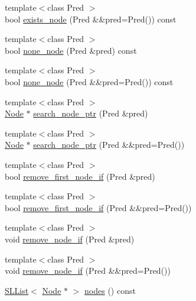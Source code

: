 \begin{DoxyCompactItemize}
\item 
{\footnotesize template$<$class Pred $>$ }\\bool \hyperlink{class_designar_1_1_base_graph_a62df2c7ec71d2b009e96f8974968a3fc}{exists\+\_\+node} (Pred \&\&pred=Pred()) const
\item 
{\footnotesize template$<$class Pred $>$ }\\bool \hyperlink{class_designar_1_1_base_graph_aa87c903e7fbf82a30edc9e442a115050}{none\+\_\+node} (Pred \&pred) const
\item 
{\footnotesize template$<$class Pred $>$ }\\bool \hyperlink{class_designar_1_1_base_graph_a394cdb81d0b0402e348dc87d2456d2d7}{none\+\_\+node} (Pred \&\&pred=Pred()) const
\item 
{\footnotesize template$<$class Pred $>$ }\\\hyperlink{namespace_designar_a5af326c65aa2bd26b26c410f2030d09e}{Node} $\ast$ \hyperlink{class_designar_1_1_base_graph_a0bbbf3b9188013698462e015f37f6b2d}{search\+\_\+node\+\_\+ptr} (Pred \&pred)
\item 
{\footnotesize template$<$class Pred $>$ }\\\hyperlink{namespace_designar_a5af326c65aa2bd26b26c410f2030d09e}{Node} $\ast$ \hyperlink{class_designar_1_1_base_graph_a1f19e5a79bfa156fd4cd80f3d8e27aa4}{search\+\_\+node\+\_\+ptr} (Pred \&\&pred=Pred())
\item 
{\footnotesize template$<$class Pred $>$ }\\bool \hyperlink{class_designar_1_1_base_graph_a1311af417ba4d373d7051b73cc2696ec}{remove\+\_\+first\+\_\+node\+\_\+if} (Pred \&pred)
\item 
{\footnotesize template$<$class Pred $>$ }\\bool \hyperlink{class_designar_1_1_base_graph_aec049416b5240910cb04b1d6f55fcecf}{remove\+\_\+first\+\_\+node\+\_\+if} (Pred \&\&pred=Pred())
\item 
{\footnotesize template$<$class Pred $>$ }\\void \hyperlink{class_designar_1_1_base_graph_aae56ca6b3b936835d07275f2ceb4b0d1}{remove\+\_\+node\+\_\+if} (Pred \&pred)
\item 
{\footnotesize template$<$class Pred $>$ }\\void \hyperlink{class_designar_1_1_base_graph_a6e63659d272255254f6abc29c1e09724}{remove\+\_\+node\+\_\+if} (Pred \&\&pred=Pred())
\item 
\hyperlink{class_designar_1_1_s_l_list}{S\+L\+List}$<$ \hyperlink{namespace_designar_a5af326c65aa2bd26b26c410f2030d09e}{Node} $\ast$ $>$ \hyperlink{class_designar_1_1_base_graph_a1fa17e5398e3f9791e1a9413a2326473}{nodes} () const

\end{DoxyCompactItemize}
